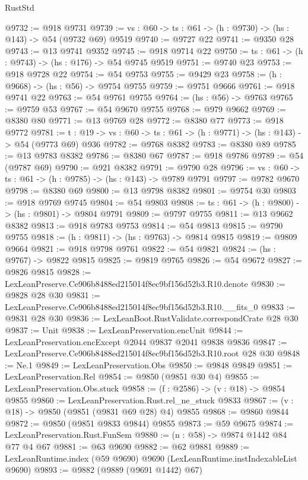 \begin{lexlean}{RustStd}
\begin{coremodule}
@9732 := @918 @9731
@9739 := {vs : @60} -> {ts : @61} -> (h : @9730) -> (hs : @143) -> @54 (@9732 @69) @9519
@9740 := @9727 @22
@9741 := @9350 @28
@9743 := @13 @9741 @9352
@9745 := @918 @9714 @22
@9750 := {ts : @61} -> (h : @9743) -> (hs : @176) -> @54 @9745 @9519
@9751 := @9740 @23
@9753 := @918 @9728 @22
@9754 := @54 @9753
@9755 := @9429 @23
@9758 := (h : @9668) -> (hs : @56) -> @9754 @9755
@9759 := @9751 @9666
@9761 := @918 @9741 @22
@9763 := @54 @9761 @9755
@9764 := (hs : @56) -> @9763
@9765 := @9759 @53
@9767 := @54 @9670 @9755
@9768 := @979 @9662
@9769 := @8380 @80
@9771 := @13 @9769 @28
@9772 := @8380 @77
@9773 := @918 @9772
@9781 := {t : @19} -> {vs : @60} -> {ts : @61} -> (h : @9771) -> (hs : @143) -> @54 (@9773 @69) @936
@9782 := @9768 @8382
@9783 := @8380 @89
@9785 := @13 @9783 @8382
@9786 := @8380 @67
@9787 := @918 @9786
@9789 := @54 (@9787 @69)
@9790 := @921 @8382
@9791 := @9790 @28
@9796 := {vs : @60} -> {ts : @61} -> (h : @9785) -> (hs : @143) -> @9789 @9791
@9797 := @9782 @9670
@9798 := @8380 @69
@9800 := @13 @9798 @8382
@9801 := @9754 @30
@9803 := @918 @9769 @9745
@9804 := @54 @9803
@9808 := {ts : @61} -> (h : @9800) -> (hs : @9801) -> @9804 @9791
@9809 := @9797 @9755
@9811 := @13 @9662 @8382
@9813 := @918 @9783 @9753
@9814 := @54 @9813
@9815 := @9790 @9755
@9818 := (h : @9811) -> (hs : @9763) -> @9814 @9815
@9819 := @9809 @9664
@9821 := @918 @9798 @9761
@9822 := @54 @9821
@9824 := (hs : @9767) -> @9822 @9815
@9825 := @9819 @9765
@9826 := @54 @9672
@9827 := @9826 @9815
@9828 := LexLeanPreserve.Ce906b8488ed215014f8ec9bf156d52b3.R10.denote
@9830 := @9828 @28 @30
@9831 := LexLeanPreserve.Ce906b8488ed215014f8ec9bf156d52b3.R10.__fits_0
@9833 := @9831 @28 @30
@9836 := LexLeanBoot.RustValidate.correspondCrate @28 @30
@9837 := Unit
@9838 := LexLeanPreservation.encUnit
@9844 := LexLeanPreservation.encExcept @2044 @9837 @2041 @9838 @9836
@9847 := LexLeanPreserve.Ce906b8488ed215014f8ec9bf156d52b3.R10.root @28 @30
@9848 := Ne.{1}
@9849 := LexLeanPreservation.Obs
@9850 := @9848 @9849
@9851 := LexLeanPreservation.Rel
@9854 := @9850 (@9851 @30 @4)
@9855 := LexLeanPreservation.Obs.stuck
@9858 := (f : @2586) -> (v : @18) -> @9854 @9855
@9860 := LexLeanPreservation.Rust.rel_ne_stuck @9833
@9867 := (v : @18) -> @9850 (@9851 (@9831 @69 @28) @4) @9855
@9868 := @9860 @9844
@9872 := @9850 (@9851 @9833 @9844) @9855
@9873 := @59 @9675
@9874 := LexLeanPreservation.Rust.FunSem
@9880 := (n : @58) -> @9874 @1442 @84 @77 @4 @67
@9881 := @63 @9690
@9882 := @62 @9881
@9889 := LexLeanRuntime.index (@59 @9690) @9690 (LexLeanRuntime.instIndexableList @9690)
@9893 := @9882 (@9889 (@9691 @1442) @67)

\end{coremodule}
\end{lexlean}
